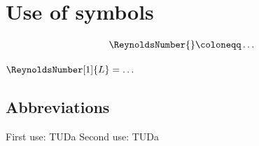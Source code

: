 


\section{Use of symbols}


\begin{align}
    \ReynoldsNumber{} \coloneqq \dots
\end{align}

\(\ReynoldsNumber[1]{L} = \dots\)

\subsection{Abbreviations}

First use: \gls{TUDa}
Second use: \gls{TUDa}